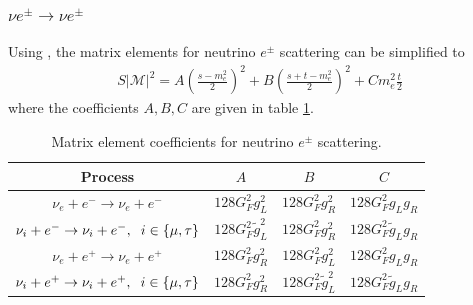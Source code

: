 \subsubsection{ $\nu e^\pm\rightarrow \nu e^\pm$}
 Using , the matrix elements for neutrino $e^\pm$ scattering can be simplified to
\begin{align}
\label{TA002}
S|\mathcal{M}|^2=A\left(\frac{s-m_e^2}{2}\right)^2+B\left(\frac{s+t-m_e^2}{2}\right)^2+Cm_e^2\frac{t}{2}
\end{align}
 where the coefficients $A,B,C$ are given in table \ref{table:nu_e_coeff}.

\begin{table}[ht]
\centering 
\begin{tabular}{|c|c|c|c|}
\hline
Process &$A$&$B$&$C$  \\
\hline
$\nu_e+e^-\rightarrow \nu_e+e^-$&$128G_F^2g_L^2$&$128G_F^2g_R^2$&$128G_F^2g_Lg_R$\\
\hline
$\nu_i+e^-\rightarrow \nu_i+e^-,\hspace{2mm} i\in\{\mu,\tau\}$&$128G_F^2\tilde g_L^2$&$128G_F^2g_R^2$&$128G_F^2\tilde g_Lg_R$\\
\hline
$\nu_e+e^+\rightarrow \nu_e+e^+$&$128G_F^2g_R^2$&$128G_F^2g_L^2$&$128G_F^2g_Lg_R$\\
\hline
$\nu_i+e^+\rightarrow \nu_i+e^+,\hspace{2mm} i\in\{\mu,\tau\}$&$128G_F^2 g_R^2$&$128G_F^2\tilde g_L^2$&$128G_F^2\tilde g_Lg_R$\\
\hline
\end{tabular}
\caption{Matrix element coefficients for neutrino $e^\pm$ scattering.}
\label{table:nu_e_coeff}
\end{table}



